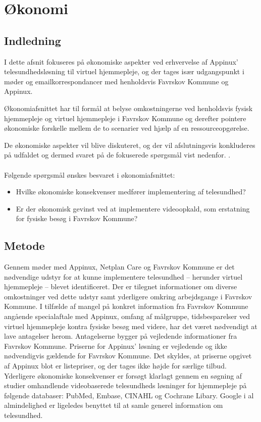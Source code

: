 \chapter{Økonomi}
\section{Indledning}
I dette afsnit fokuseres på økonomiske aspekter ved erhvervelse af Appinux’ telesundhedsløsning til virtuel hjemmepleje, og der tages især udgangspunkt i møder og emailkorrespondancer med henholdsvis Favrskov Kommune og Appinux. 

Økonomiafsnittet har til formål at belyse omkostningerne ved henholdsvis fysisk hjemmepleje og virtuel hjemmepleje i Favrskov Kommune og derefter pointere økonomiske forskelle mellem de to scenarier ved hjælp af en ressourceopgørelse.

De økonomiske aspekter vil blive diskuteret, og der vil afslutningsvis konkluderes på udfaldet og dermed svaret på de fokuserede spørgsmål vist nedenfor.
.\\ \\
Følgende spørgsmål ønskes besvaret i økonomiafsnittet:
\begin{itemize}
	\item Hvilke økonomiske konsekvenser medfører implementering af telesundhed?
	\item Er der økonomisk gevinst ved at implementere videoopkald, som erstatning for fysiske besøg i Favrskov Kommune?
\end{itemize}

\section{Metode}
Gennem møder med Appinux, Netplan Care og Favrskov Kommune er det nødvendige udstyr for at kunne implementere telesundhed – herunder virtuel hjemmepleje – blevet identificeret. 
Der er tilegnet informationer om diverse omkostninger ved dette udstyr samt yderligere omkring arbejdsgange i Favrskov Kommune.
I tilfælde af mangel på konkret information fra Favrskov Kommune angående specialaftale med Appinux, omfang af målgruppe, tidsbesparelser ved virtuel hjemmepleje kontra fysiske besøg med videre, har det været nødvendigt at lave antagelser herom. Antagelserne bygger på vejledende informationer fra Favrskov Kommune.
Priserne for Appinux’ løsning er vejledende og ikke nødvendigvis gældende for Favrskov Kommune. Det skyldes, at priserne opgivet af Appinux blot er listepriser, og der tages ikke højde for særlige tilbud. \\
Yderligere økonomiske konsekvenser er forsøgt klarlagt gennem en søgning af studier omhandlende videobaserede telesundheds løsninger for hjemmepleje på følgende databaser: PubMed, Embase, CINAHL og Cochrane Libary. Google i al almindelighed er ligeledes benyttet til at samle generel information om telesundhed.  


